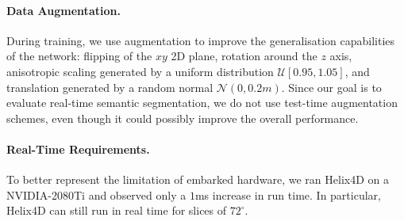 \documentclass[runningheads]{tpls/llncs}
\begin{document}
\paragraph{Data Augmentation.} During training, we use augmentation to improve the generalisation capabilities of the network: flipping of the $xy$ 2D plane, rotation around the $z$ axis, anisotropic scaling generated by a uniform distribution $\mathcal{U}[0.95,1.05]$, and translation generated by a random normal $\mathcal{N}(0, 0.2m)$. Since our goal is to evaluate real-time semantic segmentation, we do not use test-time augmentation schemes, even though it could possibly improve the overall performance.

\paragraph{Real-Time Requirements.} To better represent the limitation of embarked hardware, we ran Helix4D on a NVIDIA-2080Ti and observed only a $1$ms increase in run time. In particular, Helix4D can still run in real time for slices of $72^\circ$.
\end{document}
